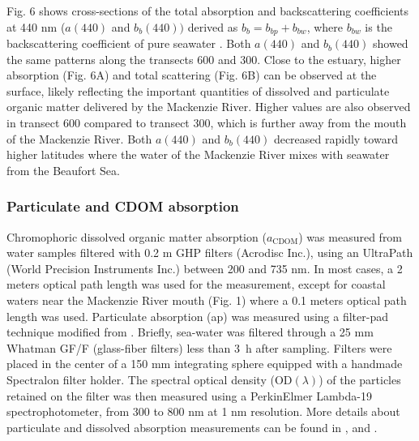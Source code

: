 \documentclass[essd, manuscript]{copernicus}
\begin{document}
Fig. 6 shows cross-sections of the total absorption and backscattering coefficients at 440 nm ($a(440)$ and $b_b(440))$ derived as $b_b = b_{bp} + b_{bw}$, where $b_{bw}$ is the backscattering coefficient of pure seawater \citep{Morel1974}. Both $a(440)$ and $b_b(440)$ showed the same patterns along the transects 600 and 300. Close to the estuary, higher absorption (Fig. 6A) and total scattering (Fig. 6B) can be observed at the surface, likely reflecting the important quantities of dissolved and particulate organic matter delivered by the Mackenzie River. Higher values are also observed in transect 600 compared to transect 300, which is further away from the mouth of the Mackenzie River. Both $a(440)$ and $b_b(440)$ decreased rapidly toward higher latitudes where the water of the Mackenzie River mixes with seawater from the Beaufort Sea.

\subsubsection{Particulate and CDOM absorption}

Chromophoric dissolved organic matter absorption ($a_\text{CDOM}$) was measured from water samples filtered with 0.2 \textmu m GHP filters (Acrodisc Inc.), using an UltraPath (World Precision Instruments Inc.) between 200 and 735 nm. In most cases, a 2 meters optical path length was used for the measurement, except for coastal waters near the Mackenzie River mouth (Fig. 1) where a 0.1 meters optical path length was used. Particulate absorption (ap) was measured using a filter-pad technique modified from \citet{Rottgers2012}. Briefly, sea-water was filtered through a 25 mm Whatman GF/F (glass-fiber filters) less than 3~h after sampling. Filters were placed in the center of a 150 mm integrating sphere equipped with a handmade Spectralon filter holder. The spectral optical density ($\text{OD}(\lambda)$) of the particles retained on the filter was then measured using a PerkinElmer Lambda-19 spectrophotometer, from 300 to 800 nm at 1 nm resolution. More details about particulate and dissolved absorption measurements can be found in \citet{Rottgers2012}, \citet{Belanger2013b} and \citet{Matsuoka2012}.
\end{document}
